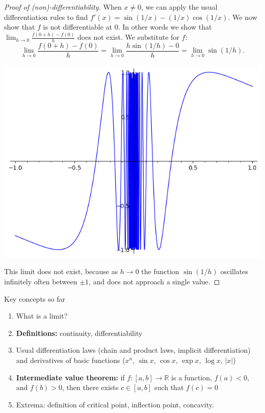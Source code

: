 \documentclass{beamer}
\newcommand{\R}{\mathbb{R}}
\begin{document}
\begin{frame}
\begin{proof}[Proof of (non)-differentiability]
  When $ x \neq 0 $, we can apply the usual differentiation rules to find $ f'(x) = \sin(1/x) - (1/x)  \cos(1/x) $. We now show that $ f $ is not
  differentiable at $ 0 $. In other words we show that $ \lim_{h \to 0} \frac{f(0+h) - f(0)}{h} $ does not exist. We substitute for $ f $:
  \begin{displaymath}
    \lim_{h \to 0} \frac{f(0+h) - f(0)}{h} = \lim_{h \to 0} \frac{h \sin(1/h) - 0}{h} = \lim_{h \to 0} \sin(1/h).
  \end{displaymath}

  \begin{center}
  \includegraphics[width=.3\textwidth]{sinx}
  \end{center}

  This limit does not exist, because as $ h \to 0 $ the function $ \sin(1/h) $ oscillates infinitely often between $ \pm 1 $, and does not approach a single value.
\end{proof}
\end{frame}


\begin{frame}{Key concepts so far}
\begin{enumerate}
  \item What is a limit?
  \item \textbf{Definitions:} continuity, differentiability
  \item Usual differentiation laws (chain and product laws, implicit differentiation) and derivatives of basic functions ($ x^n $, $ \sin x $, $ \cos x  $, $ \exp x $, $ \log x $, $ \lvert x \rvert $)
  \item \textbf{Intermediate value theorem:} if $ f : [a,b] \to \R $ is a function, $ f(a) < 0 $, and $ f(b) > 0 $, then there exists $ c \in [a,b] $ such that $ f(c) = 0 $
  \item Extrema: definition of critical point, inflection point, concavity.
\end{enumerate}
\end{frame}
\end{document}
